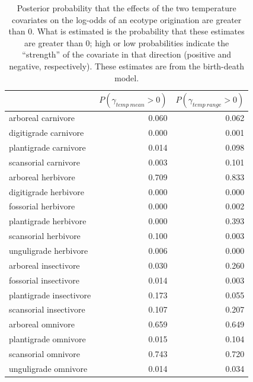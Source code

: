 \documentclass[12pt,letterpaper]{article}
\begin{document}
\begin{table}[ht]
  \centering
  \caption[Posterior probablity of effects of temperature on origination]{Posterior probability that the effects of the two temperature covariates on the log-odds of an ecotype origination are greater than 0. What is estimated is the probability that these estimates are greater than 0; high or low probabilities indicate the ``strength'' of the covariate in that direction (positive and negative, respectively). These estimates are from the birth-death model.}
  \label{tab:origin_temp}
  \begin{tabular}{ l r r }
    \hline
    & \(P(\gamma_{temp\ mean} > 0)\) & \(P(\gamma_{temp\ range} > 0)\) \\ 
    \hline
    arboreal carnivore & 0.060 & 0.062 \\ 
    digitigrade carnivore & 0.000 & 0.001 \\ 
    plantigrade carnivore & 0.014 & 0.098 \\ 
    scansorial carnivore & 0.003 & 0.101 \\ 
    arboreal herbivore & 0.709 & 0.833 \\ 
    digitigrade herbivore & 0.000 & 0.000 \\ 
    fossorial herbivore & 0.000 & 0.002 \\ 
    plantigrade herbivore & 0.000 & 0.393 \\ 
    scansorial herbivore & 0.100 & 0.003 \\ 
    unguligrade herbivore & 0.006 & 0.000 \\ 
    arboreal insectivore & 0.030 & 0.260 \\ 
    fossorial insectivore & 0.014 & 0.003 \\ 
    plantigrade insectivore & 0.173 & 0.055 \\ 
    scansorial insectivore & 0.107 & 0.207 \\ 
    arboreal omnivore & 0.659 & 0.649 \\ 
    plantigrade omnivore & 0.015 & 0.104 \\ 
    scansorial omnivore & 0.743 & 0.720 \\ 
    unguligrade omnivore & 0.014 & 0.034 \\ 
    \hline
  \end{tabular}
\end{table}
\end{document}
